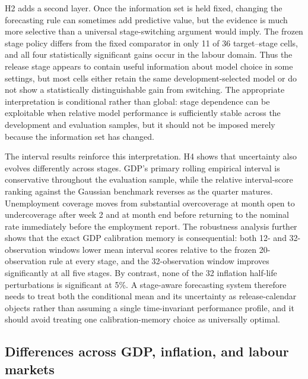 H2 adds a second layer.  Once the information set is held fixed, changing the
forecasting rule can sometimes add predictive value, but the evidence is much
more selective than a universal stage-switching argument would imply.  The
frozen stage policy differs from the fixed comparator in only 11 of 36
target--stage cells, and all four statistically significant gains occur in the
labour domain.  Thus the release stage appears to contain useful information
about model choice in some settings, but most cells either retain the same
development-selected model or do not show a statistically distinguishable
gain from switching.  The appropriate interpretation is conditional rather
than global: stage dependence can be exploitable when relative model
performance is sufficiently stable across the development and evaluation
samples, but it should not be imposed merely because the information set has
changed.

The interval results reinforce this interpretation.  H4 shows that uncertainty
also evolves differently across stages.  GDP's primary rolling empirical
interval is conservative throughout the evaluation sample, while the relative
interval-score ranking against the Gaussian benchmark reverses as the quarter
matures.  Unemployment coverage moves from substantial overcoverage at month
open to undercoverage after week 2 and at month end before returning to the
nominal rate immediately before the employment report.  The robustness analysis further shows that the exact GDP calibration
memory is consequential: both 12- and 32-observation windows lower mean
interval scores relative to the frozen 20-observation rule at every stage, and
the 32-observation window improves significantly at all five stages. By
contrast, none of the 32 inflation half-life perturbations is significant at
5\%. A stage-aware forecasting system therefore needs to treat both the
conditional mean and its uncertainty as release-calendar objects rather than
assuming a single time-invariant performance profile, and it should avoid
treating one calibration-memory choice as universally optimal.

\subsection{Differences across GDP, inflation, and labour markets}
\label{subsec:cross_domain}

